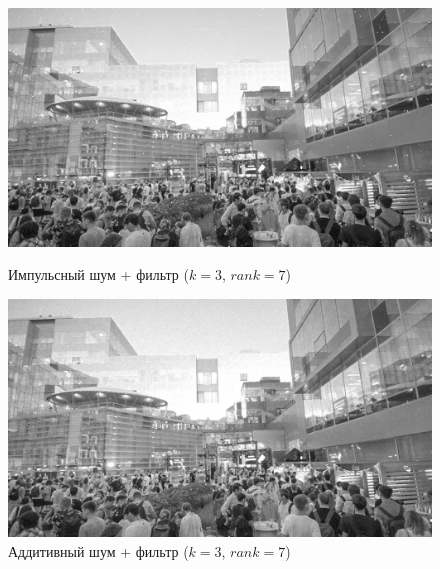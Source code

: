 \documentclass[a4paper]{article}
\begin{document}
\begin{figure}[H]
    \begin{minipage}{0.49\textwidth}
        \centering \includegraphics[width=\textwidth]{images/3_nonlinear_filters/impulse - rang (k=3, rank=7).jpg}
        \caption{Импульсный шум + фильтр ($k = 3$, $rank = 7$)}
    \end{minipage}\hfill
    \begin{minipage}{0.49\textwidth}
        \centering \includegraphics[width=\textwidth]{images/3_nonlinear_filters/additive - rang (k=3, rank=7).jpg}
        \caption{Аддитивный шум + фильтр ($k = 3$, $rank = 7$)}
    \end{minipage}
\end{figure}
\end{document}
